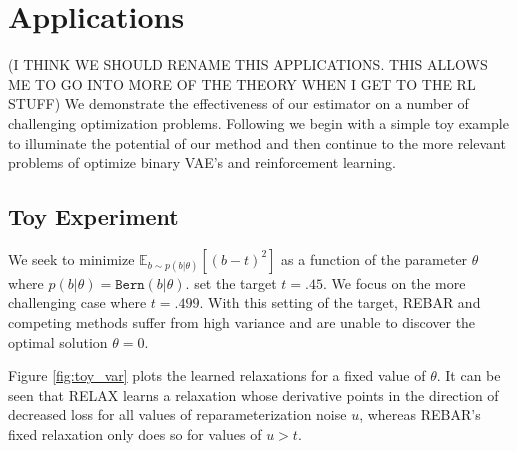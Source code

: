\documentclass{article}
\newcommand{\relaxed}{r}
\begin{document}









\section{Applications}
(I THINK WE SHOULD RENAME THIS APPLICATIONS. THIS ALLOWS ME TO GO INTO MORE OF THE THEORY WHEN I GET TO THE RL STUFF)
\label{experiments}
We demonstrate the effectiveness of our estimator on a number of challenging optimization problems. Following \cite{tucker2017rebar} we begin with a simple toy example to illuminate the potential of our method and then continue to the more relevant problems of optimize binary VAE's and reinforcement learning.

\subsection{Toy Experiment}
We seek to minimize $\mathbb{E}_{b \sim p(b|\theta)}[(b - t)^2]$ as a function of the parameter $\theta$ where $p(b|\theta) = \mathtt{Bern}(b|\theta)$. \cite{tucker2017rebar} set the target $t = .45$.
We focus on the more challenging case where $t = .499$.
With this setting of the target, REBAR and competing methods suffer from high variance and are unable to discover the optimal solution $\theta = 0$.

Figure \ref{fig:toy_var} plots the learned relaxations for a fixed value of $\theta$.
It can be seen that RELAX learns a relaxation whose derivative points in the direction of decreased loss for all values of reparameterization noise $u$, whereas REBAR's fixed relaxation only does so for values of $u > t$.
\end{document}
